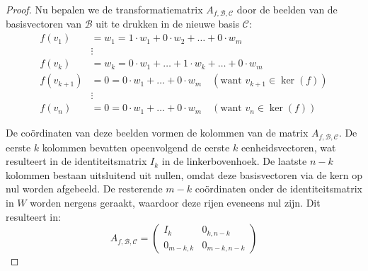 \begin{proof}
    Nu bepalen we de transformatiematrix $A_{f,\mathcal{B},\mathcal{C}}$ door de beelden van de basisvectoren van $\mathcal{B}$ uit te drukken in de nieuwe basis $\mathcal{C}$:
    $$\begin{aligned} 
        f(v_1) &= w_1 = 1\cdot w_1 + 0\cdot w_2 + \dots + 0\cdot w_m \\ 
        &\vdots \\ 
        f(v_k) &= w_k = 0\cdot w_1 + \dots + 1\cdot w_k + \dots + 0\cdot w_m \\ 
        f(v_{k+1}) &= 0 = 0\cdot w_1 + \dots + 0\cdot w_m \quad (\text{want } v_{k+1} \in \ker(f)) \\ 
        &\vdots \\ 
        f(v_n) &= 0 = 0\cdot w_1 + \dots + 0\cdot w_m \quad (\text{want } v_n \in \ker(f)) 
    \end{aligned}$$

    De coördinaten van deze beelden vormen de kolommen van de matrix $A_{f,\mathcal{B},\mathcal{C}}$. 
    De eerste $k$ kolommen bevatten opeenvolgend de eerste $k$ eenheidsvectoren, wat resulteert in de identiteitsmatrix $I_k$ in de linkerbovenhoek.
    De laatste $n-k$ kolommen bestaan uitsluitend uit nullen, omdat deze basisvectoren via de kern op nul worden afgebeeld. 
    De resterende $m-k$ coördinaten onder de identiteitsmatrix in $W$ worden nergens geraakt, waardoor deze rijen eveneens nul zijn.
    Dit resulteert in:
    $$A_{f,\mathcal{B},\mathcal{C}} = \left(\begin{array}{c|c} 
        I_k & 0_{k,n-k} \\ \hline 
        0_{m-k,k} & 0_{m-k,n-k} 
    \end{array}\right)$$
\end{proof}